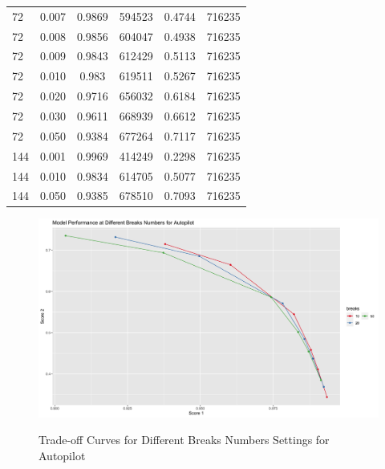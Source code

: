\documentclass{article}
\begin{document}
\begin{longtable}[htbp]{l|l|*{4}{c}}
  72 & 0.007 & 0.9869 & 594523 & 0.4744 & 716235\\
  72 & 0.008 & 0.9856 & 604047 & 0.4938 & 716235\\
  72 & 0.009 & 0.9843 & 612429 & 0.5113 & 716235\\
  72 & 0.010 & 0.983 & 619511 & 0.5267 & 716235\\
  72 & 0.020 & 0.9716 & 656032 & 0.6184 & 716235\\
  72 & 0.030 & 0.9611 & 668939 & 0.6612 & 716235\\
  72 & 0.050 & 0.9384 & 677264 & 0.7117 & 716235\\
  144 & 0.001 & 0.9969 & 414249 & 0.2298 & 716235\\
  144 & 0.010 & 0.9834 & 614705 & 0.5077 & 716235\\
  144 & 0.050 & 0.9385 & 678510 & 0.7093 & 716235\\
\end{longtable}

\begin{figure}
  \caption{Trade-off Curves for Different Breaks Numbers Settings for Autopilot}
  \centering
  \includegraphics{images/ModelPerformanceatDifferentBreaksNumbersforAutopilot.png}
  \label{fig:fig1.11.4}
\end{figure}
\end{document}
